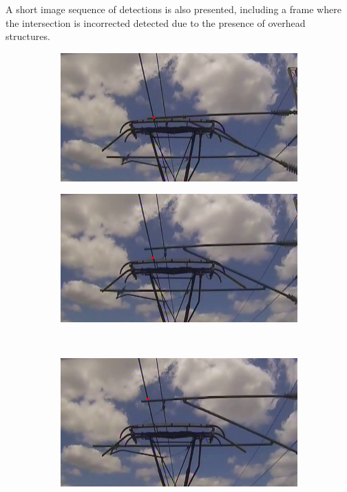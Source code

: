 A short image sequence of detections is also presented, including a frame where the intersection is incorrected detected due to the presence of overhead structures.

\begin{figure}[ht]
  \centering
  \begin{subfigure}[b]{0.3\textwidth}
    \centering
    \includegraphics[width=\textwidth]{images/q2_results_b1.png}
    \caption{}
  \end{subfigure}
  \hspace{3em}
  \begin{subfigure}[b]{0.3\textwidth}
    \centering
    \includegraphics[width=\textwidth]{images/q2_results_b2.png}
    \caption{}
  \end{subfigure}
  \\ \vspace{1em}
  \begin{subfigure}[b]{0.3\textwidth}
    \centering
    \includegraphics[width=\textwidth]{images/q2_results_b3.png}

\end{subfigure}
\end{figure}
